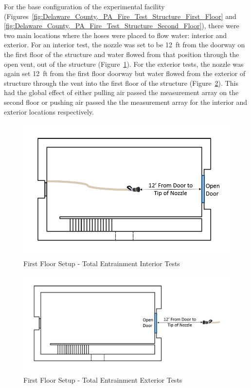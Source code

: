 \documentclass[12pt,oneside]{book}
\begin{document}
For the base configuration of the experimental facility (Figures~\ref{fig:Delaware_County,_PA_Fire_Test_Structure_First_Floor} and \ref{fig:Delaware_County,_PA_Fire_Test_Structure_Second_Floor}), there were two main locations where the hoses were placed to flow water: interior and exterior. For an interior test, the nozzle was set to be 12~ft from the doorway on the first floor of the structure and water flowed from that position through the open vent, out of the structure (Figure~\ref{fig:First_Floor_Setup_Total_Entrainment_Interior_Tests}). For the exterior tests, the nozzle was again set 12~ft from the first floor doorway but water flowed from the exterior of structure through the vent into the first floor of the structure (Figure~\ref{fig:First_Floor_Setup_Total_Entrainment_Exterior_Tests}). This had the global effect of either pulling air passed the measurement array on the second floor or pushing air passed the the measurement array for the interior and exterior locations respectively.

\begin{figure}[!ht]
	\centering
	\includegraphics[width=.6\columnwidth]{Figures/Air_Entrainment/Measurement_Locations_Firstfloor}
	\caption{First Floor Setup - Total Entrainment Interior Tests}
	\label{fig:First_Floor_Setup_Total_Entrainment_Interior_Tests}
\end{figure}

\begin{figure}[!ht]
	\centering
	\includegraphics[width=.95\columnwidth]{Figures/Air_Entrainment/Measurement_Locations_Firstfloor_Ext}
	\caption{First Floor Setup - Total Entrainment Exterior Tests}
	\label{fig:First_Floor_Setup_Total_Entrainment_Exterior_Tests}
\end{figure}
\end{document}

